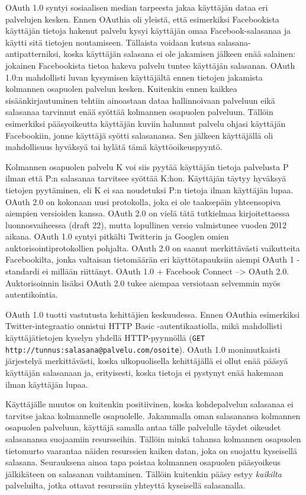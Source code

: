 \documentclass[finnish,gradu]{tktltiki}
\begin{document}
  OAuth 1.0 syntyi sosiaalisen median tarpeesta jakaa käyttäjän dataa eri palvelujen kesken. Ennen OAuthia oli yleistä, että esimerkiksi Facebookista käyttäjän tietoja hakenut palvelu kysyi käyttäjän omaa Facebook-salasanaa ja käytti sitä tietojen noutamiseen. Tällaista voidaan kutsua salasana-antipatterniksi, koska käyttäjän salasana ei ole jakamisen jälkeen enää salainen: jokainen Facebookista tietoa hakeva palvelu tuntee käyttäjän salasanan. OAuth 1.0:n mahdollisti luvan kysymisen käyttäjältä ennen tietojen jakamista kolmannen osapuolen palvelun kesken. Kuitenkin ennen kaikkea sisäänkirjautuminen tehtiin ainoastaan dataa hallinnoivaan palveluun eikä salasanaa tarvinnut enää syöttää kolmannen osapuolen palveluun. Tällöin esimerkiksi pääsyoikeutta käyttäjän kuviin halunnut palvelu ohjasi käyttäjän Facebookiin, jonne käyttäjä syötti salasanansa. Sen jälkeen käyttäjällä oli mahdollisuus hyväksyä tai hylätä tämä käyttöoikeuspyyntö.

  Kolmannen osapuolen palvelu K voi siis pyytää käyttäjän tietoja palvelusta P ilman että P:n salasanaa tarvitsee syöttää K:hon. Käyttäjän täytyy hyväksyä tietojen pyytäminen, eli K ei saa noudetuksi P:n tietoja ilman käyttäjän lupaa.
  OAuth 2.0 on kokonaan uusi protokolla, joka ei ole taaksepäin yhteensopiva aiempien versioiden kanssa. OAuth 2.0 on vielä tätä tutkielmaa kirjoitettaessa luonnosvaiheessa (draft 22), mutta lopullinen versio valmistunee vuoden 2012 aikana. OAuth 1.0 syntyi pitkälti Twitterin ja Googlen omien auktorisointiprotokollien pohjalta. OAuth 2.0 on saanut merkittävästi vaikutteita Facebookilta, jonka valtaisan tietomäärän eri käyttötapauksiin aiempi OAuth 1 -standardi ei millään riittänyt. OAuth 1.0 + Facebook Connect --> OAuth 2.0. Auktorisoinnin lisäksi OAuth 2.0 tukee aiempaa versiotaan selvemmin myös autentikointia.

  OAuth 1.0 tuotti vastutusta kehittäjien keskuudessa. Ennen OAuthia esimerkiksi Twitter-integraatio onnistui HTTP Basic -autentikaatiolla, mikä mahdollisti käyttäjätietojen kyselyn yhdellä HTTP-pyynnöllä (\verb#GET http://tunnus:salasana@palvelu.com/osoite#). OAuth 1.0 monimutkaisti järjestelyä merkittävästi, koska ulkopuolisella kehittäjällä ei ollut enää pääsyä käyttäjän salasanaan ja, erityisesti, koska tietoja ei pystynyt enää hakemaan ilman käyttäjän lupaa.

  Käyttäjälle muutos on kuitenkin positiivinen, koska kohdepalvelun salasanaa ei tarvitse jakaa kolmannelle osapuolelle. Jakammalla oman salasanansa kolmannen osapuolen palveluun, käyttäjä samalla antaa tälle palvelulle täydet oikeudet salasanansa suojaamiin resursseihin. Tällöin minkä tahansa kolmannen osapuolen tietomurto vaarantaa näiden resurssien kaiken datan, joka on suojattu kyseisellä salasana. Seurauksena ainoa tapa poistaa kolmannen osapuolen pääsyoikeus jälkikäteen on salasanan vaihtaminen. Tällöin kuitenkin pääsy estyy \emph{kaikilta} palveluilta, jotka ottavat resurssiin yhteyttä kyseisellä salasanalla.
\end{document}
